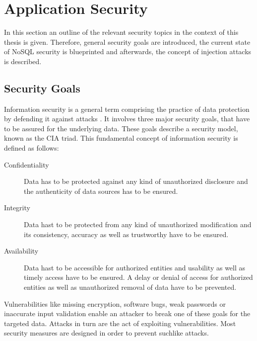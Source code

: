 \section{Application Security}
In this section an outline of the relevant security topics in the context of this thesis is given. Therefore, general security goals are introduced, the current state of NoSQL security is blueprinted and afterwards, the concept of injection attacks is described.

\subsection{Security Goals}
Information security is a general term comprising the practice of data protection by defending it against attacks \cite{olivier2002database,Perrin:2008}. It involves three major security goals, that have to be assured for the underlying data. These goals describe a security model, known as the CIA triad. This fundamental concept of information security is defined as follows:

\begin{description}
\item [Confidentiality] Data has to be protected against any kind of unauthorized disclosure and the authenticity of data sources has to be ensured.
\item [Integrity] Data hast to be protected from any kind of unauthorized modification and its consistency, accuracy as well as trustworthy have to be ensured.
\item [Availability] Data hast to be accessible for authorized entities and usability as well as timely access have to be ensured. A delay or denial of access for authorized entities as well as unauthorized removal of data have to be prevented.
\end{description}

Vulnerabilities like missing encryption, software bugs, weak passwords or inaccurate input validation enable an attacker to break one of these goals for the targeted data. Attacks in turn are the act of exploiting vulnerabilities. Most security measures are designed in order to prevent suchlike attacks.

